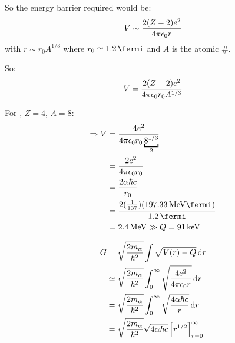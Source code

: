 \begin{parts}
	So the energy barrier required would be:
	\begin{equation*}
		V \sim \frac{2(Z-2)e^2}{4\pi\epsilon_{0} r}
	\end{equation*}
	with $r \sim r_0 A^{1/3}$ where $r_0 \simeq \SI{1.2}{\fermi}$ and $A$ is the atomic \#.
	
	So:
	\begin{equation*}
		V = \frac{2(Z-2)e^2}{4\pi\epsilon_{0} r_0 A^{1/3}}
	\end{equation*}
	
	For , $Z=4$, $A=8$:
	\begin{align*}
		\Rightarrow V &= \frac{4e^2}{4\pi\permittivity r_0 \underbracket{8^{1/3}}_{2}} \\
		&= \frac{2e^2}{4\pi\permittivity r_0} \\
		&= \frac{2\alpha\hbar c}{r_0} \\
		&= \frac{2(\frac{1}{137})(\SI{197.33}{\mega\electronvolt\fermi})}{\SI{1.2}{\fermi}} \\
		&= \SI{2.4}{\mega\electronvolt} \gg Q = \SI{91}{\kilo\electronvolt}
	\end{align*}
	
	\begin{align*}
		G &= \sqrt{\frac{2m_\alpha}{\hbar^2}} \int {\sqrt{V(r) - Q}} \,\mathrm{d}{r} \\
		&\simeq \sqrt{\frac{2m_\alpha}{\hbar^2}} \int_{0}^{\infty} {\sqrt{\frac{4e^2}{4\pi\epsilon_{0} r}}} \,\mathrm{d}{r} \\
		&= \sqrt{\frac{2m_\alpha}{\hbar^2}} \int_{0}^{\infty} {\sqrt{\frac{4\alpha\hbar c}{r}}} \,\mathrm{d}{r} \\
		&= \sqrt{\frac{2m_\alpha}{\hbar^2}} \sqrt{4\alpha\hbar c} \left[r^{1/2}\right]_{r=0}^\infty
	\end{align*}
\end{parts}
